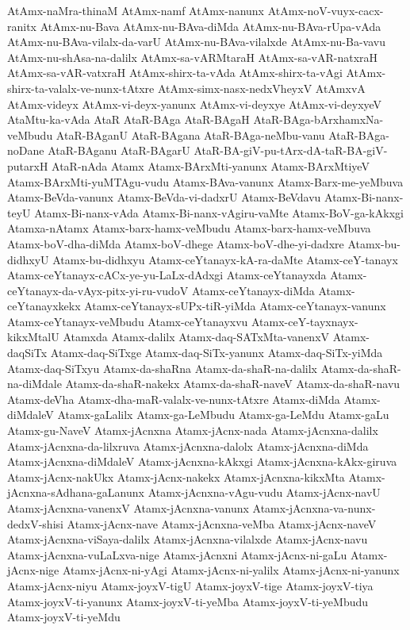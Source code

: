 {AtAmx-naMra-thinaM
AtAmx-namf
AtAmx-nanunx
AtAmx-noV-vuyx-cacx-ranitx
AtAmx-nu-Bava
AtAmx-nu-BAva-diMda
AtAmx-nu-BAva-rUpa-vAda
AtAmx-nu-BAva-vilalx-da-varU
AtAmx-nu-BAva-vilalxde
AtAmx-nu-Ba-vavu
AtAmx-nu-shAsa-na-dalilx
AtAmx-sa-vARMtaraH
AtAmx-sa-vAR-natxraH
AtAmx-sa-vAR-vatxraH
AtAmx-shirx-ta-vAda
AtAmx-shirx-ta-vAgi
AtAmx-shirx-ta-valalx-ve-nunx-tAtxre
AtAmx-simx-nasx-nedxVheyxV
AtAmxvA
AtAmx-videyx
AtAmx-vi-deyx-yanunx
AtAmx-vi-deyxye
AtAmx-vi-deyxyeV
AtaMtu-ka-vAda
AtaR
AtaR-BAga
AtaR-BAgaH
AtaR-BAga-bArxhamxNa-veMbudu
AtaR-BAganU
AtaR-BAgana
AtaR-BAga-neMbu-vanu
AtaR-BAga-noDane
AtaR-BAganu
AtaR-BAgarU
AtaR-BA-giV-pu-tArx-dA-taR-BA-giV-putarxH
AtaR-nAda
Atamx
Atamx-BArxMti-yanunx
Atamx-BArxMtiyeV
Atamx-BArxMti-yuMTAgu-vudu
Atamx-BAva-vanunx
Atamx-Barx-me-yeMbuva
Atamx-BeVda-vanunx
Atamx-BeVda-vi-dadxrU
Atamx-BeVdavu
Atamx-Bi-nanx-teyU
Atamx-Bi-nanx-vAda
Atamx-Bi-nanx-vAgiru-vaMte
Atamx-BoV-ga-kAkxgi
Atamxa-nAtamx
Atamx-barx-hamx-veMbudu
Atamx-barx-hamx-veMbuva
Atamx-boV-dha-diMda
Atamx-boV-dhege
Atamx-boV-dhe-yi-dadxre
Atamx-bu-didhxyU
Atamx-bu-didhxyu
Atamx-ceYtanayx-kA-ra-daMte
Atamx-ceY-tanayx
Atamx-ceYtanayx-cACx-ye-yu-LaLx-dAdxgi
Atamx-ceYtanayxda
Atamx-ceYtanayx-da-vAyx-pitx-yi-ru-vudoV
Atamx-ceYtanayx-diMda
Atamx-ceYtanayxkekx
Atamx-ceYtanayx-sUPx-tiR-yiMda
Atamx-ceYtanayx-vanunx
Atamx-ceYtanayx-veMbudu
Atamx-ceYtanayxvu
Atamx-ceY-tayxnayx-kikxMtalU
Atamxda
Atamx-dalilx
Atamx-daq-SATxMta-vanenxV
Atamx-daqSiTx
Atamx-daq-SiTxge
Atamx-daq-SiTx-yanunx
Atamx-daq-SiTx-yiMda
Atamx-daq-SiTxyu
Atamx-da-shaRna
Atamx-da-shaR-na-dalilx
Atamx-da-shaR-na-diMdale
Atamx-da-shaR-nakekx
Atamx-da-shaR-naveV
Atamx-da-shaR-navu
Atamx-deVha
Atamx-dha-maR-valalx-ve-nunx-tAtxre
Atamx-diMda
Atamx-diMdaleV
Atamx-gaLalilx
Atamx-ga-LeMbudu
Atamx-ga-LeMdu
Atamx-gaLu
Atamx-gu-NaveV
Atamx-jAcnxna
Atamx-jAcnx-nada
Atamx-jAcnxna-dalilx
Atamx-jAcnxna-da-lilxruva
Atamx-jAcnxna-dalolx
Atamx-jAcnxna-diMda
Atamx-jAcnxna-diMdaleV
Atamx-jAcnxna-kAkxgi
Atamx-jAcnxna-kAkx-giruva
Atamx-jAcnx-nakUkx
Atamx-jAcnx-nakekx
Atamx-jAcnxna-kikxMta
Atamx-jAcnxna-sAdhana-gaLanunx
Atamx-jAcnxna-vAgu-vudu
Atamx-jAcnx-navU
Atamx-jAcnxna-vanenxV
Atamx-jAcnxna-vanunx
Atamx-jAcnxna-va-nunx-dedxV-shisi
Atamx-jAcnx-nave
Atamx-jAcnxna-veMba
Atamx-jAcnx-naveV
Atamx-jAcnxna-viSaya-dalilx
Atamx-jAcnxna-vilalxde
Atamx-jAcnx-navu
Atamx-jAcnxna-vuLaLxva-nige
Atamx-jAcnxni
Atamx-jAcnx-ni-gaLu
Atamx-jAcnx-nige
Atamx-jAcnx-ni-yAgi
Atamx-jAcnx-ni-yalilx
Atamx-jAcnx-ni-yanunx
Atamx-jAcnx-niyu
Atamx-joyxV-tigU
Atamx-joyxV-tige
Atamx-joyxV-tiya
Atamx-joyxV-ti-yanunx
Atamx-joyxV-ti-yeMba
Atamx-joyxV-ti-yeMbudu
Atamx-joyxV-ti-yeMdu
}
